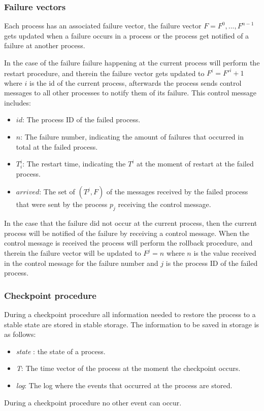 \documentclass[twocolumn, a4paper,11pt]{article}%
\begin{document}
\subsubsection{Failure vectors}
\par Each process has an associated failure vector, the failure vector  \(F = F^{0},...,F^{n-1}\) gets updated when a failure occurs in a process or the process get notified of a failure at another process. 
\par In the case of the failure failure happening at the current process will perform the restart procedure, and therein the failure vector gets updated to \(F^{i} = F'^{i} +1\) where \(i\) is the id of the current process, afterwards the process sends control messages to all other processes to notify them of its failure. This control message includes:
\begin{itemize}
	\item \(id\): The process ID of the failed process.
	\item \(n\): The failure number, indicating the amount of failures that occurred in total at the failed process.
	\item \(T_{i}^{i}\): The restart time, indicating the \(T^{i}\) at the moment of restart at the failed process.
	\item \(arrived\): The set of \((T^{j}, F)\)  of the messages received by the failed process that were sent by the process \(p_{j}\) receiving the control message.
\end{itemize}
In the case that the failure did not occur at the current process, then the current process will be notified of the failure by receiving a control message. When the control message is received the process will perform the rollback procedure, and therein the failure vector will be updated to \(F^{j} = n\) where \(n\) is the value received in the control message for the failure number and \(j\) is the process ID of the failed process.

\subsubsection{Checkpoint procedure}
During a checkpoint procedure all information needed to restore the process to a stable state are stored in stable storage. The information to be saved in storage is as follows:
\begin{itemize}
	\item \textit{state} : the state of a process.
	\item \textit{T}: The time vector of the process at the moment the checkpoint occurs.
	\item \textit{log}: The log where the events that occurred at the process are stored.
\end{itemize} 
During a checkpoint procedure no other event can occur.
\end{document}
